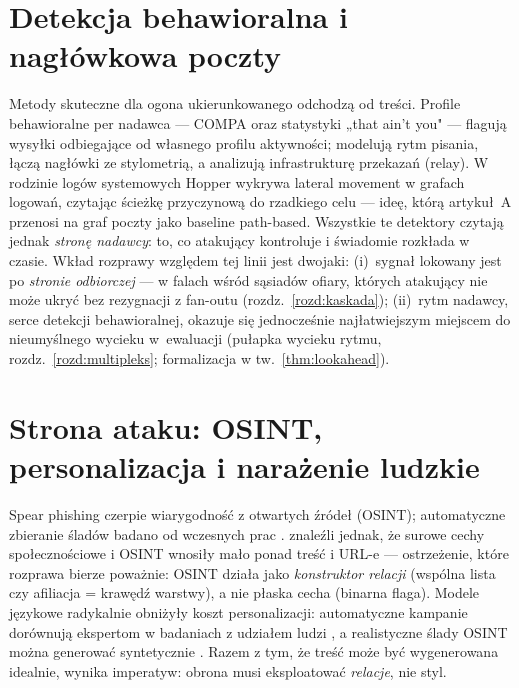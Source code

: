 \section{Detekcja behawioralna i nagłówkowa poczty}
\label{sec:p-behawioralna}

Metody skuteczne dla ogona ukierunkowanego odchodzą od treści.
Profile behawioralne per nadawca --- COMPA \citep{egele2013compa}
oraz statystyki „that ain't you" \citep{stringhini2015thataint} ---
flagują wysyłki odbiegające od własnego profilu aktywności;
\citet{gascon2018reading} modelują rytm pisania,
\citet{duman2016emailprofiler} łączą nagłówki ze stylometrią,
a \citet{luo2024characterizing} analizują infrastrukturę przekazań
(relay). W rodzinie logów systemowych Hopper \citep{ho2021hopper}
wykrywa lateral movement w grafach logowań, czytając ścieżkę
przyczynową do rzadkiego celu --- ideę, którą artykuł~A przenosi
na graf poczty jako baseline path-based. Wszystkie te detektory
czytają jednak \emph{stronę nadawcy}: to, co atakujący kontroluje
i świadomie rozkłada w czasie. Wkład rozprawy względem tej linii
jest dwojaki: (i)~sygnał lokowany jest po \emph{stronie odbiorczej}
--- w falach wśród sąsiadów ofiary, których atakujący nie może
ukryć bez rezygnacji z fan-outu (rozdz.~\ref{rozd:kaskada});
(ii)~rytm nadawcy, serce detekcji behawioralnej, okazuje się
jednocześnie najłatwiejszym miejscem do nieumyślnego wycieku
w~ewaluacji (pułapka wycieku rytmu, rozdz.~\ref{rozd:multipleks};
formalizacja w tw.~\ref{thm:lookahead}).

\section{Strona ataku: OSINT, personalizacja i narażenie ludzkie}
\label{sec:p-osint}

Spear phishing czerpie wiarygodność z otwartych źródeł (OSINT);
automatyczne zbieranie śladów badano od wczesnych prac
\citep{edwards2017panning}. \citet{dewan2014analyzing,dewan2017facebook}
znaleźli jednak, że surowe cechy społecznościowe i OSINT wnosiły
mało ponad treść i URL-e --- ostrzeżenie, które rozprawa bierze
poważnie: OSINT działa jako \emph{konstruktor relacji} (wspólna
lista czy afiliacja = krawędź warstwy), a nie płaska cecha
(binarna flaga). Modele językowe radykalnie obniżyły koszt
personalizacji: automatyczne kampanie dorównują ekspertom
w badaniach z udziałem ludzi \citep{bethany2024evaluating},
a realistyczne ślady OSINT można generować syntetycznie
\citep{brown2025web}. Razem z tym, że treść może być wygenerowana
idealnie, wynika imperatyw: obrona musi eksploatować \emph{relacje},
nie styl.


